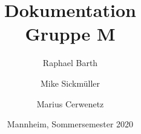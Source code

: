 
 \subject{Mobile Anwendungen}   %

\title{Dokumentation\\Gruppe M}

\author{Raphael Barth \and Mike Sickmüller \and Marius Cerwenetz}

\date{Mannheim, Sommersemester 2020}





